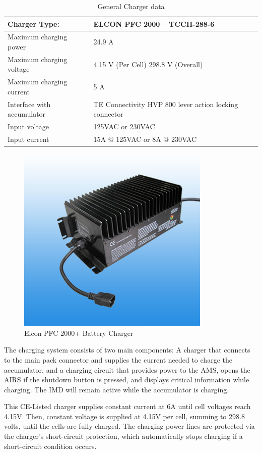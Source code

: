 \documentclass{article}
\begin{document}
	\begin{table}[H]
	    \centering
	    \begin{tabular}{|l|l|}
	        \hline
	        Charger Type: & ELCON PFC 2000+ TCCH-288-6  \\ \hline
	        Maximum charging power & 24.9 A \\ \hline
	        Maximum charging voltage & 4.15 V (Per Cell) 298.8 V (Overall) \\ \hline
	        Maximum charging current & 5 A \\ \hline
	        Interface with accumulator & TE Connectivity HVP 800 lever action locking connector \\ \hline
	        Input voltage & 125VAC or 230VAC \\ \hline
	        Input current & 15A @ 125VAC or 8A @ 230VAC  \\ \hline
	    \end{tabular}
	    \caption{General Charger data}
	    \label{charger}
	\end{table}


 	\begin{figure}[H]
		\centering
		\includegraphics[width = 0.4 \textwidth]{Battery_Charger.jpg}
		\caption{Elcon PFC 2000+ Battery Charger}
		\label{Elcon Battery Charger}
	\end{figure}

	The charging system consists of two main components:  A charger that connects to the main pack connector and supplies the current needed to charge the accumulator, and a charging circuit that provides power to the AMS, opens the AIRS if the shutdown button is pressed, and displays critical information while charging. The IMD will remain active while the accumulator is charging.
	
	This CE-Listed charger supplies constant current at 6A until cell voltages reach 4.15V. Then, constant voltage is supplied at 4.15V per cell, summing to 298.8 volts, until the cells are fully charged. The charging power lines are protected via the charger's short-circuit protection, which automatically stops charging if a short-circuit condition occurs.
	
\end{document}
